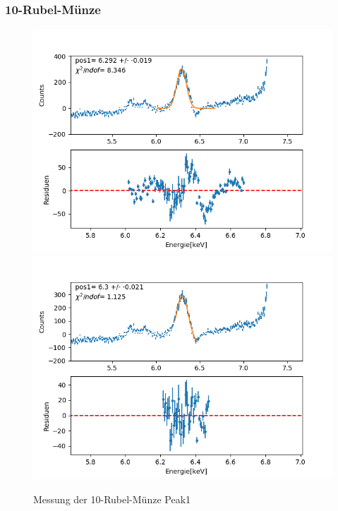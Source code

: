 \documentclass[12pt,a4paper]{article}
\begin{document}
\subsubsection{10-Rubel-Münze}
\begin{figure}[H]
\centering
\includegraphics[scale=0.49]{Bilder/roentgen_spektren/rubel/rub1_1.png}
\includegraphics[scale=0.49]{Bilder/roentgen_spektren/rubel/rub1_2.png}
\caption{Messung der 10-Rubel-Münze Peak1}
\end{figure}
\end{document}
